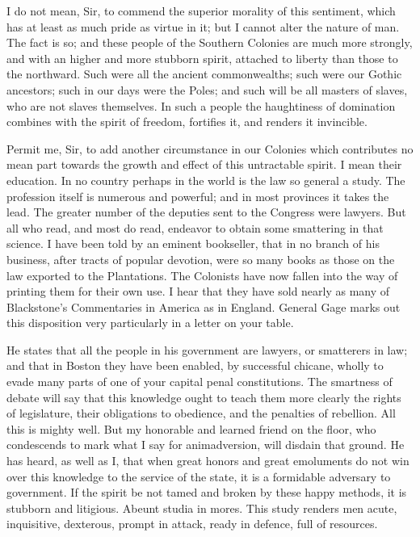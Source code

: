 I do not mean, Sir, to commend the superior morality of this sentiment, which has at least as much pride as virtue in it; but I cannot alter the nature of man. The fact is so; and these people of the Southern Colonies are much more strongly, and with an higher and more stubborn spirit, attached to liberty than those to the northward. Such were all the ancient commonwealths; such were our Gothic ancestors; such in our days were the Poles; and such will be all masters of slaves, who are not slaves themselves. In such a people the haughtiness of domination combines with the spirit of freedom, fortifies it, and renders it invincible.\par

Permit me, Sir, to add another circumstance in our Colonies which contributes no mean part towards the growth and effect of this untractable spirit. I mean their education. In no country perhaps in the world is the law so general a study. The profession itself is numerous and powerful; and in most provinces it takes the lead. The greater number of the deputies sent to the Congress were lawyers. But all who read, and most do read, endeavor to obtain some smattering in that science. I have been told by an eminent bookseller, that in no branch of his business, after tracts of popular devotion, were so many books as those on the law exported to the Plantations. The Colonists have now fallen into the way of printing them for their own use. I hear that they have sold nearly as many of Blackstone’s Commentaries in America as in England. General Gage marks out this disposition very particularly in a letter on your table.\par

He states that all the people in his government are lawyers, or smatterers in law; and that in Boston they have been enabled, by successful chicane, wholly to evade many parts of one of your capital penal constitutions. The smartness of debate will say that this knowledge ought to teach them more clearly the rights of legislature, their obligations to obedience, and the penalties of rebellion. All this is mighty well. But my honorable and learned friend on the floor, who condescends to mark what I say for animadversion, will disdain that ground. He has heard, as well as I, that when great honors and great emoluments do not win over this knowledge to the service of the state, it is a formidable adversary to government. If the spirit be not tamed and broken by these happy methods, it is stubborn and litigious. Abeunt studia in mores. This study renders men acute, inquisitive, dexterous, prompt in attack, ready in defence, full of resources.\par

